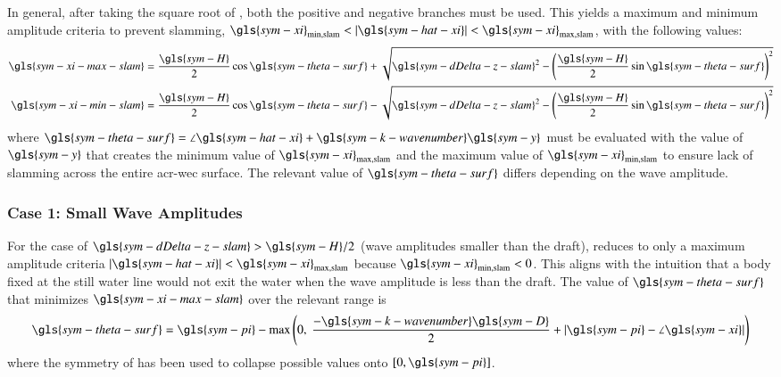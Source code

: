 In general, after taking the square root of , both the positive and negative branches must be used.
This yields a maximum and minimum amplitude criteria to prevent slamming, $\gls{sym-xi}_{\text{min},\text{slam}}<|\gls{sym-hat-xi}|<\gls{sym-xi}_{\text{max},\text{slam}}$, with the following values:
\begin{equation}\label{eq:slamming-min-max}
\begin{aligned}
    \gls{sym-xi-max-slam} &= \frac{\gls{sym-H}}{2} \cos\gls{sym-theta-surf} + \sqrt{\gls{sym-dDelta-z-slam}^2-\left(\frac{\gls{sym-H}}{2}\sin\gls{sym-theta-surf}\right)^2 } \\
    \gls{sym-xi-min-slam} &= \frac{\gls{sym-H}}{2} \cos\gls{sym-theta-surf} - \sqrt{\gls{sym-dDelta-z-slam}^2-\left(\frac{\gls{sym-H}}{2}\sin\gls{sym-theta-surf}\right)^2 }
\end{aligned}
\end{equation}
where $\gls{sym-theta-surf}=\angle\gls{sym-hat-xi} + \gls{sym-k-wavenumber}\gls{sym-y}$ must be evaluated with the value of $\gls{sym-y}$ that creates the minimum value of $\gls{sym-xi}_{\text{max},\text{slam}}$ and the maximum value of $\gls{sym-xi}_{\text{min},\text{slam}}$ to ensure lack of slamming across the entire \gls{acr-wec} surface.
The relevant value of $\gls{sym-theta-surf}$ differs depending on the wave amplitude.

\subsubsection{Case 1: Small Wave Amplitudes}
For the case of $\gls{sym-dDelta-z-slam} >\gls{sym-H}/2$ (wave amplitudes smaller than the draft),  reduces to only a maximum amplitude criteria $|\gls{sym-hat-xi}|<\gls{sym-xi}_{\text{max},\text{slam}}$ because $\gls{sym-xi}_{\text{min},\text{slam}}<0$.
This aligns with the intuition that a body fixed at the still water line would not exit the water when the wave amplitude is less than the draft.
The value of $\gls{sym-theta-surf}$ that minimizes $\gls{sym-xi-max-slam}$ over the relevant range is
\begin{equation}\label{eq:slamming-limit-small-waves}
\gls{sym-theta-surf} = \gls{sym-pi} - \max\left(
                                            0,~
                                            \frac{-\gls{sym-k-wavenumber}\gls{sym-D}}{2}
                                            + |\gls{sym-pi}-\angle \gls{sym-xi}|
                                     \right)
\end{equation}
where the symmetry of  has been used to collapse possible values onto $[0,\gls{sym-pi}]$.


